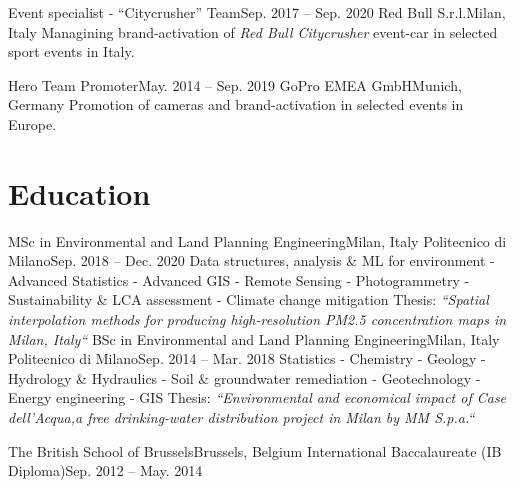 \documentclass[letterpaper,11pt]{article}
\begin{document}
\sectionElement
{Event specialist - “Citycrusher” Team}{Sep. 2017 -- Sep. 2020}
{Red Bull S.r.l.}{Milan, Italy}
{Managining brand-activation of \textit{Red Bull Citycrusher} event-car in selected sport
  events in Italy.}
{}

\sectionElement
{Hero Team Promoter}{May. 2014 -- Sep. 2019}
{GoPro EMEA GmbH}{Munich, Germany}
{Promotion of cameras and brand-activation in selected events in Europe.}
{}
\sectionElementListEnd


\section{Education}
\sectionElementListStart

\sectionElement
{MSc in Environmental and Land Planning Engineering}{Milan, Italy}
{Politecnico di Milano}{Sep. 2018 -- Dec. 2020}
{\scriptsize Data structures, analysis \& ML for environment - Advanced Statistics - Advanced GIS -
  Remote Sensing - Photogrammetry -
  Sustainability \& LCA assessment - Climate change mitigation\newline
  {\scriptsize Thesis: \it “Spatial interpolation methods for producing high-resolution PM2.5 concentration maps in Milan, Italy“}}
{}
\sectionElement
{BSc in Environmental and Land Planning Engineering}{Milan, Italy}
{Politecnico di Milano}{Sep. 2014 -- Mar. 2018}
{\scriptsize Statistics - Chemistry - Geology - Hydrology \& Hydraulics
  - Soil \& groundwater remediation - Geotechnology - Energy engineering - GIS\newline
  {\scriptsize Thesis: \it “Environmental and economical impact of Case dell'Acqua,a free drinking-water distribution project in Milan by MM S.p.a.“}}
{}

\sectionElement
{The British School of Brussels}{Brussels, Belgium}
{International Baccalaureate (IB Diploma)}{Sep. 2012 -- May. 2014}
{}{}

\sectionElementListEnd

\end{document}
